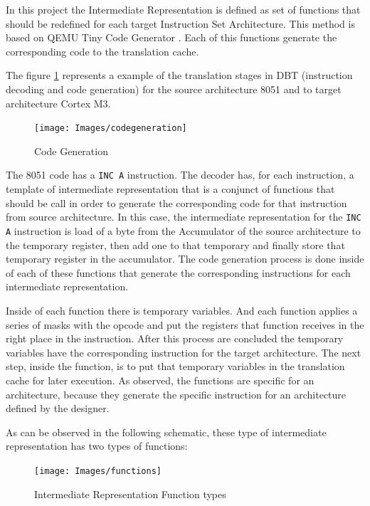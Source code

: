 \documentclass[11pt]{report}
\begin{document}
	In this project the Intermediate Representation is defined as set of functions that should be redefined for each target Instruction Set Architecture. This method is based on QEMU Tiny Code Generator \cite{fabricebellard}. Each of this functions generate the corresponding code to the translation cache. 
	
	The figure \ref{fig:generation} represents a example of the translation stages in DBT (instruction decoding and code generation) for the source architecture 8051 and to target architecture Cortex M3.
	
	\begin{figure} [H]
		\centering
		\texttt{[image: Images/codegeneration]}
		\caption{Code Generation}
		\label{fig:generation}
	\end{figure}	
	
	The 8051 code has a \texttt{INC A} instruction. The decoder has, for each instruction, a template of intermediate representation that is a conjunct of functions that should be call in order to generate the corresponding code for that instruction from source architecture. In this case, the intermediate representation for  the \texttt{INC A} instruction is load of a byte from the Accumulator of the source architecture to the temporary register, then add one to that temporary and finally store that temporary register in the accumulator. The code generation process is done inside of each of these functions that generate the corresponding instructions for each intermediate representation.
	
	Inside of each function there is temporary variables. And each function applies a series of masks with the opcode and put the registers that function receives in the right place in the instruction. After this process are concluded the temporary variables have the corresponding instruction for the target architecture. The next step, inside the function, is to put that temporary variables in the translation cache for later execution. As observed, the functions are specific for an architecture, because they generate the specific instruction for an architecture defined by the designer. 

	As can be observed in the following schematic, these type of intermediate representation has two types of functions:
	
	\begin{figure} [H]
		\centering
		\texttt{[image: Images/functions]}
		\caption{Intermediate Representation Function types}
		\label{fig:genfunctions}
	\end{figure}
	
\end{document}
